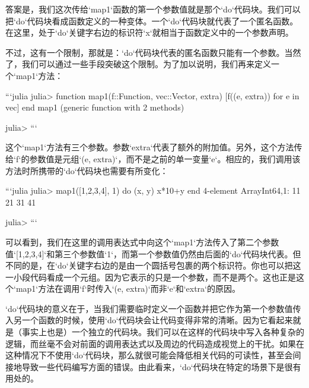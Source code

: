 答案是，我们这次传给`map1`函数的第一个参数值就是那个`do`代码块。我们可以把`do`代码块看成函数定义的一种变体。一个`do`代码块就代表了一个匿名函数。在这里，处于`do`关键字右边的标识符`x`就相当于函数定义中的一个参数声明。

不过，这有一个限制，那就是：`do`代码块代表的匿名函数只能有一个参数。当然了，我们可以通过一些手段突破这个限制。为了加以说明，我们再来定义一个`map1`方法：

```julia
julia> function map1(f::Function, vec::Vector, extra)
           [f((e, extra)) for e in vec]
       end
map1 (generic function with 2 methods)

julia> 
```

这个`map1`方法有三个参数。参数`extra`代表了额外的附加值。另外，这个方法传给`f`的参数值是元组`(e, extra)`，而不是之前的单一变量`e`。相应的，我们调用该方法时所携带的`do`代码块也需要有所变化：

```julia
julia> map1([1,2,3,4], 1) do (x, y)
           x*10+y
       end
4-element Array{Int64,1}:
 11
 21
 31
 41

julia> 
```

可以看到，我们在这里的调用表达式中向这个`map1`方法传入了第二个参数值`[1,2,3,4]`和第三个参数值`1`，而第一个参数值仍然由后面的`do`代码块代表。但不同的是，在`do`关键字右边的是由一个圆括号包裹的两个标识符。你也可以把这一小段代码看成一个元组。因为它表示的只是一个参数，而不是两个。这也正是这个`map1`方法在调用`f`时传入`(e, extra)`而非`e`和`extra`的原因。

`do`代码块的意义在于，当我们需要临时定义一个函数并把它作为第一个参数值传入另一个函数的时候，使用`do`代码块会让代码变得非常的清晰。因为它看起来就是（事实上也是）一个独立的代码块。我们可以在这样的代码块中写入各种复杂的逻辑，而丝毫不会对前面的调用表达式以及周边的代码造成视觉上的干扰。如果在这种情况下不使用`do`代码块，那么就很可能会降低相关代码的可读性，甚至会间接地导致一些代码编写方面的错误。由此看来，`do`代码块在特定的场景下是很有用处的。